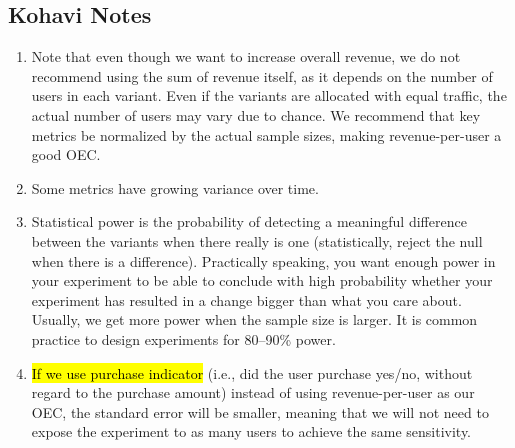 \subsection{Kohavi Notes}
\label{sec:KohaviNotes}

\begin{enumerate}
\item Note that even though we want to increase overall revenue, we do
not recommend using the sum of revenue itself, as it depends on the number of
users in each variant. Even if the variants are allocated with equal traffic, the
actual number of users may vary due to chance. We recommend that key
metrics be normalized by the actual sample sizes, making revenue-per-user a
good OEC.

\item Some metrics have growing variance over time.

\item Statistical power is the probability of detecting a meaningful difference
between the variants when there really is one (statistically, reject the null when
there is a difference). 
Practically speaking, you want enough power in your
experiment to be able to conclude with high probability whether your 
experiment has resulted in a change bigger than what you care about. Usually, we get
more power when the sample size is larger. It is common practice to design
experiments for 80–90\% power.

\item \hl{If we use purchase indicator} (i.e., did the user purchase yes/no, without
regard to the purchase amount) instead of using revenue-per-user as our
OEC, the standard error will be smaller, meaning that we will not need to
expose the experiment to as many users to achieve the same sensitivity.
\end{enumerate}
